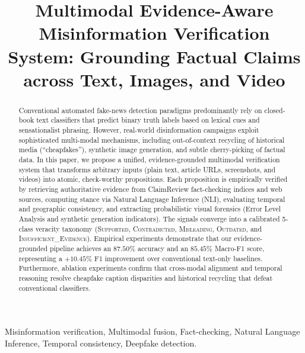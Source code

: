 \documentclass[conference]{IEEEtran}
\begin{document}
\title{Multimodal Evidence-Aware Misinformation Verification System: Grounding Factual Claims across Text, Images, and Video}

\author{
}

\maketitle

\begin{abstract}
Conventional automated fake-news detection paradigms predominantly rely on closed-book text classifiers that predict binary truth labels based on lexical cues and sensationalist phrasing. However, real-world disinformation campaigns exploit sophisticated multi-modal mechanisms, including out-of-context recycling of historical media (``cheapfakes''), synthetic image generation, and subtle cherry-picking of factual data. In this paper, we propose a unified, evidence-grounded multimodal verification system that transforms arbitrary inputs (plain text, article URLs, screenshots, and videos) into atomic, check-worthy propositions. Each proposition is empirically verified by retrieving authoritative evidence from ClaimReview fact-checking indices and web sources, computing stance via Natural Language Inference (NLI), evaluating temporal and geographic consistency, and extracting probabilistic visual forensics (Error Level Analysis and synthetic generation indicators). The signals converge into a calibrated 5-class veracity taxonomy (\textsc{Supported}, \textsc{Contradicted}, \textsc{Misleading}, \textsc{Outdated}, and \textsc{Insufficient\_Evidence}). Empirical experiments demonstrate that our evidence-grounded pipeline achieves an $87.50\%$ accuracy and an $85.45\%$ Macro-F1 score, representing a $+10.45\%$ F1 improvement over conventional text-only baselines. Furthermore, ablation experiments confirm that cross-modal alignment and temporal reasoning resolve cheapfake caption disparities and historical recycling that defeat conventional classifiers.
\end{abstract}

\begin{IEEEkeywords}
Misinformation verification, Multimodal fusion, Fact-checking, Natural Language Inference, Temporal consistency, Deepfake detection.
\end{IEEEkeywords}
\end{document}
